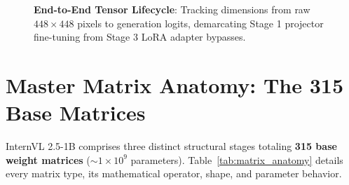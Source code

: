\documentclass[11pt, a4paper]{article}
\begin{document}
\begin{figure}[htbp]
{
}
\caption{\textbf{End-to-End Tensor Lifecycle}: Tracking dimensions from raw $448 \times 448$ pixels to generation logits, demarcating Stage 1 projector fine-tuning from Stage 3 LoRA adapter bypasses.}
\label{fig:multimodal_trace}
\end{figure}

\newpage
\section{Master Matrix Anatomy: The 315 Base Matrices}
InternVL 2.5-1B comprises three distinct structural stages totaling \textbf{315 base weight matrices} ($\sim 1\times 10^9$ parameters). Table~\ref{tab:matrix_anatomy} details every matrix type, its mathematical operator, shape, and parameter behavior.
\end{document}
